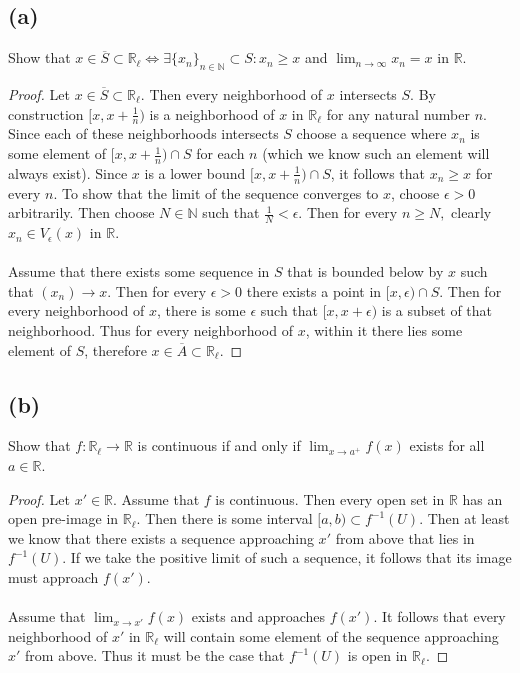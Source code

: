 \documentclass{article}
\theoremstyle{definition}
\begin{document}
    \subsection*{(a)}
        Show that 
        $x \in \overline{S} \subset \mathbb{R}_\ell \Longleftrightarrow \exists \{x_n\}_{n \in \mathbb{N}} \subset S : x_n \geqslant x$ and $\lim_{n \rightarrow \infty}x_n = x$ in $\mathbb{R}$.
        \begin{proof}
            \fbox{$\Rightarrow$} Let $x \in \overline{S} \subset \mathbb{R}_\ell$.
            Then every neighborhood of $x$ intersects $S$.
            By construction $[x,x + \frac{1}{n})$ is a neighborhood of $x$ in $\mathbb{R}_\ell$ for any 
            natural number $n$. Since each of these neighborhoods intersects $S$ choose a sequence where $x_n$ is some element of $[x, x + \frac{1}{n}) \cap S$
            for each $n$ (which we know such an element will always exist). Since $x$ is a lower bound $[x, x + \frac{1}{n}) \cap S$, it follows that $x_n \geqslant x$
            for every $n$. To show that the limit of the sequence converges to $x$, choose $\epsilon > 0$ arbitrarily. Then
            choose $N \in \mathbb{N}$ such that $\frac{1}{N} < \epsilon$. Then for every $n \geqslant N,$ clearly $x_n \in V_\epsilon(x)$ in $\mathbb{R}$.\\\\
            \fbox{$\Leftarrow$}
            Assume that there exists some sequence in $S$ that is bounded below by $x$ such that $(x_n) \rightarrow x$. Then for every $\epsilon > 0$ there exists a point in $[x,\epsilon) \cap S$.
            Then for every neighborhood of $x$, there is some $\epsilon$ such that $[x, x + \epsilon)$ is a subset of that neighborhood.
            Thus for every neighborhood of $x$, within it there lies some element of $S$, therefore $x \in \overline{A} \subset \mathbb{R}_\ell$.
        \end{proof}
    \subsection*{(b)}
    Show that $f: \mathbb{R}_\ell \rightarrow \mathbb{R}$ is continuous if and only if $\lim_{x \rightarrow a^+}f(x)$ exists for all $a \in \mathbb{R}$.
    \begin{proof}
        \fbox{$\Rightarrow$} Let $x' \in \mathbb{R}$. Assume that $f$ is continuous. Then every open set in $\mathbb{R}$ has an open pre-image in $\mathbb{R}_\ell$.
        Then there is some interval $[a, b) \subset f^{-1}(U)$. Then at least we know that there exists a sequence approaching $x'$ from above that lies in $f^{-1}(U)$.
        If we take the positive limit of such a sequence, it follows that its image must approach $f(x')$. \\\\
        \fbox{$\Leftarrow$} Assume that $\lim_{x \rightarrow x'}f(x)$ exists and approaches $f(x')$.
        It follows that every neighborhood of $x'$ in $\mathbb{R}_\ell$ will contain some element of the sequence approaching $x'$ from above.
        Thus it must be the case that $f^{-1}(U)$ is open in $\mathbb{R}_\ell$.
    \end{proof}
\end{document}
